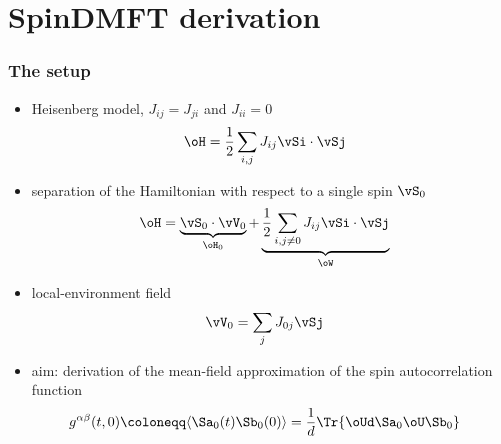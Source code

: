 \section{ SpinDMFT derivation }

\begin{frame}
	\frametitle{ The setup }
    \begin{itemize}
        \item Heisenberg model, $J_{ij} = J_{ji}$ and $J_{ii} = 0$
        \begin{align*}
            \oH &= \frac12 \sum_{i,j} J_{ij} \vSi \cdot \vSj
        \end{align*}
        \item separation of the Hamiltonian with respect to a single spin $\vS_0$
        \begin{align*}
            \oH &= \underbrace{\vS_0 \cdot \vV_0}_{\oH_0} + \underbrace{\frac12 \sum_{i,j \neq 0} J_{ij} \vSi \cdot \vSj}_{\oW}
        \end{align*}
        \item local-environment field
        \begin{align*}
            \vV_0 &= \sum_{j} J_{0j} \vSj
        \end{align*}
        \item aim: derivation of the mean-field approximation of the spin autocorrelation function 
        \begin{align*}
            g^{\alpha\beta}(t,0) &\coloneqq \langle \Sa_0 (t) \Sb_0 (0) \rangle = \frac{1}{d} \Tr{ \oUd \Sa_0 \oU \Sb_0 }
        \end{align*}
    \end{itemize}
\end{frame}


